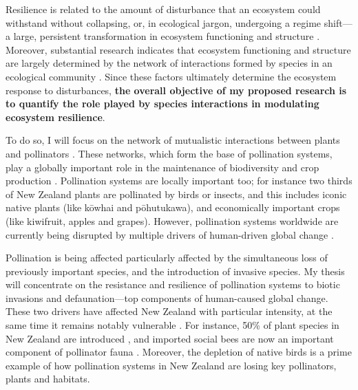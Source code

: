 \documentclass[a4paper]{article}
\begin{document}
Resilience is related to the amount of disturbance that an ecosystem could withstand without collapsing, or, in ecological jargon, undergoing a regime shift---a large, persistent transformation in ecosystem functioning and structure \autocite{Holling1973, Gunderson2000}.
Moreover, substantial research indicates that ecosystem functioning and structure are largely determined by the network of interactions formed by species in an ecological community \autocite{Bascompte2006, Dobson2006, Tylianakis2008, Reiss2009}.
Since these factors ultimately determine the ecosystem response to disturbances, \textbf{the overall objective of my proposed research is to quantify the role played by species interactions in modulating ecosystem resilience}.

To do so, I will focus on the network of mutualistic interactions between plants and pollinators \autocite{Bascompte2006, Bascompte2007, Klein2007}.
These networks, which form the base of pollination systems, play a globally important role in the maintenance of biodiversity and crop production \autocite{Bascompte2007, Klein2007}.
Pollination systems are locally important too; for instance two thirds of New Zealand plants are pollinated by birds or insects\autocite{Cox2000}, and this includes iconic native plants (like k\={o}whai and p\={o}hutukawa), and economically important crops (like kiwifruit, apples and grapes). However, pollination systems worldwide are currently being disrupted by multiple drivers of human-driven global change \autocite{Cox2000}.

Pollination is being affected particularly affected by the simultaneous loss of previously important species, and the introduction of invasive species.
My thesis will concentrate on the resistance and resilience of pollination systems to biotic invasions and defaunation---top components of human-caused global change.
These two drivers have affected New Zealand with particular intensity, at the same time it remains notably vulnerable \autocite{Vitousek1997}.
For instance, 50\% of plant species in New Zealand are introduced \autocite{Wilton2000}, and imported social bees are now an important component of pollinator fauna \autocite{Lloyd1985, Newstrom2005}.
Moreover, the depletion of native birds \autocite{Anderson2003, Robertson2009} is a prime example of how pollination systems in New Zealand are losing key pollinators, plants and habitats\autocite{Cox2000}.
\end{document}
